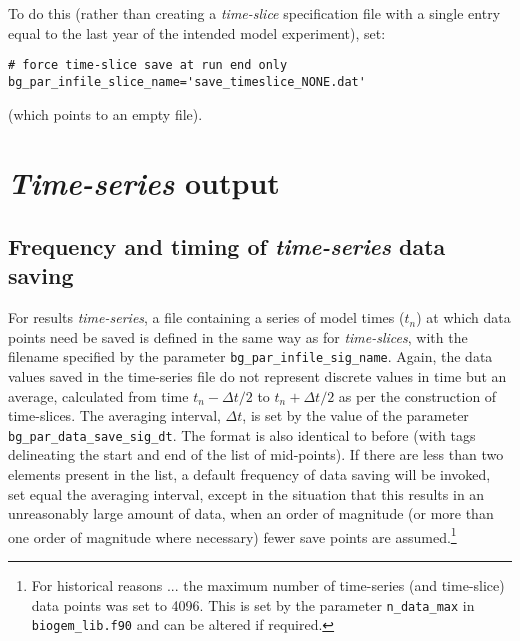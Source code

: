 \documentclass[11pt,fleqn]{book} %
\begin{document}
To do this (rather than creating a \textit{time-slice} specification file with a single entry equal to the last year of the intended model experiment), set:
\small\begin{verbatim}
# force time-slice save at run end only
bg_par_infile_slice_name='save_timeslice_NONE.dat'
\end{verbatim}\normalsize
(which points to an empty file).


\newpage


\section{\textit{Time-series} output}


\subsection{Frequency and timing of \textit{time-series} data saving}

For results \textit{time-series}, a file containing a series of model times (\begin{math}t_{n}\end{math}) at which data points need be saved is defined in the same way as for \textit{time-slices}, with the filename specified by the parameter \texttt{bg\_par\_infile\_sig\_name}. Again, the data values saved in the time-series file do not represent discrete values in time but an average, calculated from time \begin{math}t_{n} - \Delta t/2\end{math} to \begin{math}t_{n} + \Delta t/2\end{math} as per the construction of time-slices. The averaging interval, \begin{math}\Delta t\end{math}, is set by the value of the parameter \texttt{bg\_par\_data\_save\_sig\_dt}. The format is also identical to before (with tags delineating the start and end of the list of mid-points). If there are less than two elements present in the list, a default frequency of data saving will be invoked, set equal the averaging interval, except in the situation that this results in an unreasonably large amount of data, when an order of magnitude (or more than one order of magnitude where necessary) fewer save points are assumed.\footnote{For historical reasons ... the maximum number of time-series (and time-slice) data points was set to 4096. This is set by the parameter \texttt{n\_data\_max} in \texttt{biogem\_lib.f90} and can be altered if required.} 
\end{document}

